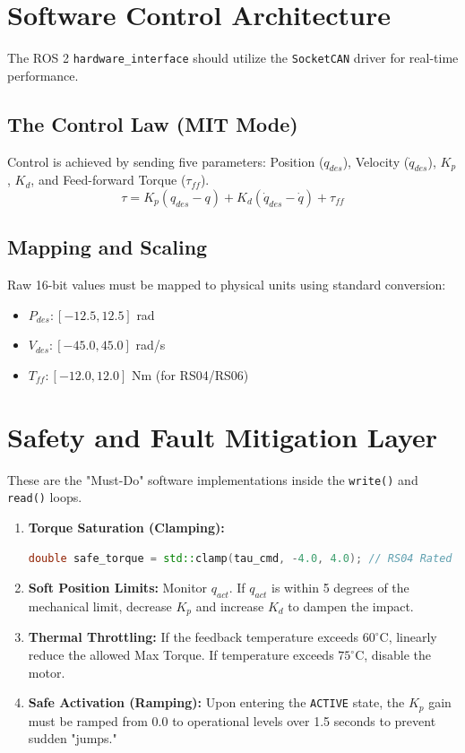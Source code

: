 \documentclass[11pt,a4paper]{article}
\begin{document}
\section{Software Control Architecture}
The ROS 2 \texttt{hardware\_interface} should utilize the \texttt{SocketCAN} driver for real-time performance.

\subsection{The Control Law (MIT Mode)}
Control is achieved by sending five parameters: Position ($q_{des}$), Velocity ($\dot{q}_{des}$), $K_p$, $K_d$, and Feed-forward Torque ($\tau_{ff}$).
\begin{equation}
\tau = K_p(q_{des} - q) + K_d(\dot{q}_{des} - \dot{q}) + \tau_{ff}
\end{equation}

\subsection{Mapping and Scaling}
Raw 16-bit values must be mapped to physical units using standard conversion:
\begin{itemize}
    \item $P_{des}: [-12.5, 12.5]$ rad
    \item $V_{des}: [-45.0, 45.0]$ rad/s
    \item $T_{ff}: [-12.0, 12.0]$ Nm (for RS04/RS06)
\end{itemize}

\section{Safety and Fault Mitigation Layer}
These are the "Must-Do" software implementations inside the \texttt{write()} and \texttt{read()} loops.

\begin{enumerate}
    \item \textbf{Torque Saturation (Clamping):}
    \begin{lstlisting}[language=C++, frame=single, basicstyle=\small\ttfamily]
    double safe_torque = std::clamp(tau_cmd, -4.0, 4.0); // RS04 Rated
    \end{lstlisting}
    \item \textbf{Soft Position Limits:} Monitor $q_{act}$. If $q_{act}$ is within 5 degrees of the mechanical limit, decrease $K_p$ and increase $K_d$ to dampen the impact.
    \item \textbf{Thermal Throttling:} If the feedback temperature exceeds $60^\circ$C, linearly reduce the allowed Max Torque. If temperature exceeds $75^\circ$C, disable the motor.
    \item \textbf{Safe Activation (Ramping):} Upon entering the \texttt{ACTIVE} state, the $K_p$ gain must be ramped from 0.0 to operational levels over 1.5 seconds to prevent sudden "jumps."
\end{enumerate}
\end{document}
